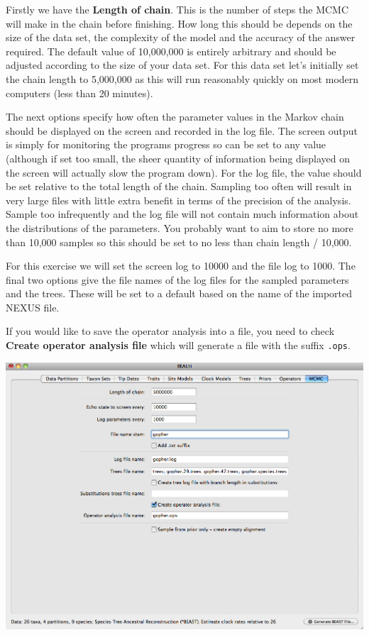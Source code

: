 \documentclass[12pt]{article}
\begin{document}
Firstly we have the \textbf{Length of chain}. This is the number of
steps the MCMC will make in the chain before finishing. How long this
should be depends on the size of the data set, the complexity of the
model and the accuracy of the answer required. The default value of 10,000,000
is entirely arbitrary and should be adjusted according to the size
of your data set. For this data set let's initially set the chain
length to 5,000,000 as this will run reasonably quickly on most modern
computers (less than 20 minutes).

The next options specify how often the parameter values in the Markov
chain should be displayed on the screen and recorded in the log file.
The screen output is simply for monitoring the programs progress so
can be set to any value (although if set too small, the sheer quantity
of information being displayed on the screen will actually slow the
program down). For the log file, the value should be set relative
to the total length of the chain. Sampling too often will result in
very large files with little extra benefit in terms of the precision
of the analysis. Sample too infrequently and the log file will not
contain much information about the distributions of the parameters. 
You probably want to aim to store no more than 10,000 samples so this should be
set to no less than chain length / 10,000.

For this exercise we will set the screen log to 10000 and the file log to 1000. The final two
options give the file names of the log files for the sampled parameters and
the trees. These will be set to a default based on the name of the
imported NEXUS file. 

If you would like to save the operator analysis into a file, you need to check  \textbf{Create operator analysis file} which will generate a file with the suffix \texttt{.ops}. 

\medskip{}

\includegraphics[scale=0.4]{figures/BEAUti_MCMC}
\end{document}
